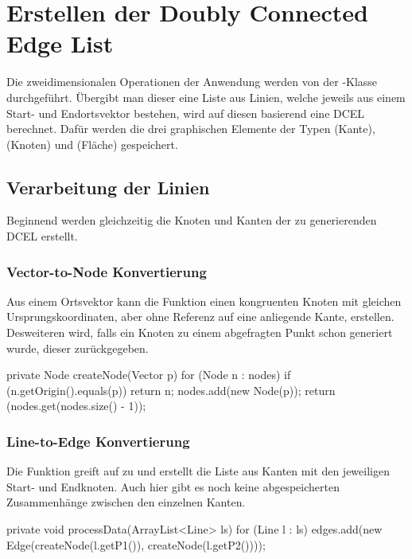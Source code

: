 \section{Erstellen der Doubly Connected Edge List}
Die zweidimensionalen Operationen der Anwendung werden von der -Klasse durchgeführt. 
Übergibt man dieser eine Liste aus Linien, welche jeweils aus einem Start- und Endortsvektor bestehen, wird auf diesen basierend eine DCEL berechnet.
Dafür werden die drei graphischen Elemente der Typen  (Kante),  (Knoten) und  (Fläche) gespeichert.

\subsection{Verarbeitung der Linien}
Beginnend werden gleichzeitig die Knoten und Kanten der zu generierenden DCEL erstellt.
\subsubsection{Vector-to-Node Konvertierung}
Aus einem Ortsvektor kann die Funktion  einen kongruenten Knoten mit gleichen Ursprungskoordinaten, aber ohne Referenz auf eine anliegende Kante, erstellen. 
Desweiteren wird, falls ein Knoten zu einem abgefragten Punkt schon generiert wurde, dieser zurückgegeben. \\

\begin{code}
	private Node createNode(Vector p) {
		for (Node n : nodes) {
			if (n.getOrigin().equals(p)) {
				return n;
			}
		}
		nodes.add(new Node(p));
		return (nodes.get(nodes.size() - 1));
	}
\end{code}

\subsubsection{Line-to-Edge Konvertierung}
\label{subsec:ltoe} 
Die  Funktion greift auf  zu und erstellt die Liste aus Kanten mit den jeweiligen Start- und Endknoten.
Auch hier gibt es noch keine abgespeicherten Zusammenhänge zwischen den einzelnen Kanten. \\

\begin{code}
	private void processData(ArrayList<Line> ls) {
		for (Line l : ls) {
			edges.add(new Edge(createNode(l.getP1()), createNode(l.getP2())));
		}
	}
\end{code}


